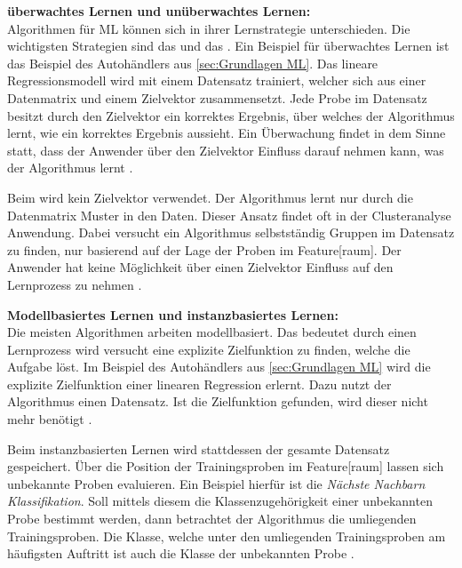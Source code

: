 \textbf{\Gls{überwachtes Lernen} und \gls{unüberwachtes Lernen}:}\\
Algorithmen für \gls{ML} können sich in ihrer Lernstrategie unterschieden. Die wichtigsten Strategien sind das  und das . Ein Beispiel für \gls{überwachtes Lernen} ist das Beispiel des Autohändlers aus \ref{sec:Grundlagen ML}. Das lineare Regressionsmodell wird mit einem Datensatz trainiert, welcher sich aus einer \gls{Datenmatrix} und einem \gls{Zielvektor} zusammensetzt. Jede Probe im Datensatz besitzt durch den \gls{Zielvektor} ein korrektes Ergebnis, über welches der Algorithmus lernt, wie ein korrektes Ergebnis aussieht. Ein Überwachung findet in dem Sinne statt, dass der Anwender über den \gls{Zielvektor} Einfluss darauf nehmen kann, was der Algorithmus lernt \cite{Burkov.2019, Goodfellow.2016}.\par

Beim  wird kein \gls{Zielvektor} verwendet. Der Algorithmus lernt nur durch die \gls{Datenmatrix} Muster in den Daten. Dieser Ansatz findet oft in der Clusteranalyse Anwendung. Dabei versucht ein Algorithmus selbstständig Gruppen im Datensatz zu finden, nur basierend auf der Lage der Proben im \gls{Feature}[raum]. Der Anwender hat keine Möglichkeit über einen \gls{Zielvektor} Einfluss auf den Lernprozess zu nehmen \cite{Burkov.2019, Goodfellow.2016}. \par

\textbf{Modellbasiertes Lernen und instanzbasiertes Lernen:}\\
Die meisten Algorithmen arbeiten modellbasiert. Das bedeutet durch einen Lernprozess wird versucht eine explizite \gls{Zielfunktion} zu finden, welche die Aufgabe löst. Im Beispiel des Autohändlers aus \ref{sec:Grundlagen ML} wird die explizite \gls{Zielfunktion} einer linearen Regression erlernt. Dazu nutzt der Algorithmus einen Datensatz. Ist die \gls{Zielfunktion} gefunden, wird dieser nicht mehr benötigt \cite{Burkov.2019}.\par

Beim instanzbasierten Lernen wird stattdessen der gesamte Datensatz gespeichert. Über die Position der Trainingsproben im \gls{Feature}[raum] lassen sich unbekannte Proben evaluieren. Ein Beispiel hierfür ist die \textit{Nächste Nachbarn Klassifikation}. Soll mittels diesem  die Klassenzugehörigkeit einer unbekannten Probe bestimmt werden, dann betrachtet der Algorithmus die umliegenden Trainingsproben. Die Klasse, welche unter den umliegenden  Trainingsproben am häufigsten Auftritt ist auch die Klasse der unbekannten Probe \cite{Burkov.2019, Mitchell.1997}.\par


